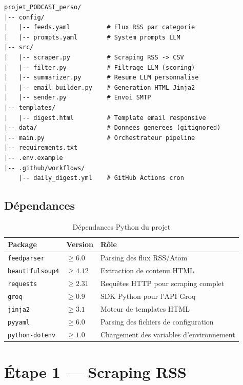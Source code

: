 \documentclass[11pt, a4paper]{article}
\begin{document}
\begin{lstlisting}[language={}, caption={Arborescence du projet}]
projet_PODCAST_perso/
|-- config/
|   |-- feeds.yaml          # Flux RSS par categorie
|   |-- prompts.yaml        # System prompts LLM
|-- src/
|   |-- scraper.py          # Scraping RSS -> CSV
|   |-- filter.py           # Filtrage LLM (scoring)
|   |-- summarizer.py       # Resume LLM personnalise
|   |-- email_builder.py    # Generation HTML Jinja2
|   |-- sender.py           # Envoi SMTP
|-- templates/
|   |-- digest.html         # Template email responsive
|-- data/                   # Donnees generees (gitignored)
|-- main.py                 # Orchestrateur pipeline
|-- requirements.txt
|-- .env.example
|-- .github/workflows/
    |-- daily_digest.yml    # GitHub Actions cron
\end{lstlisting}

\subsection{Dépendances}

\begin{table}[h]
\centering
\begin{tabular}{lll}
\toprule
\textbf{Package} & \textbf{Version} & \textbf{Rôle} \\
\midrule
\texttt{feedparser} & $\geq 6.0$ & Parsing des flux RSS/Atom \\
\texttt{beautifulsoup4} & $\geq 4.12$ & Extraction de contenu HTML \\
\texttt{requests} & $\geq 2.31$ & Requêtes HTTP pour scraping complet \\
\texttt{groq} & $\geq 0.9$ & SDK Python pour l'API Groq \\
\texttt{jinja2} & $\geq 3.1$ & Moteur de templates HTML \\
\texttt{pyyaml} & $\geq 6.0$ & Parsing des fichiers de configuration \\
\texttt{python-dotenv} & $\geq 1.0$ & Chargement des variables d'environnement \\
\bottomrule
\end{tabular}
\caption{Dépendances Python du projet}
\end{table}

\section{Étape 1 --- Scraping RSS}
\end{document}
